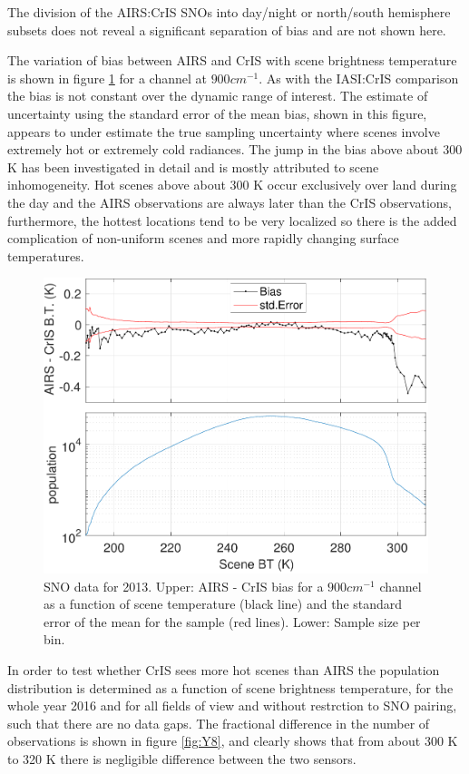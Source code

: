 \documentclass[twocolumn,10pt]{article}
\begin{document}
The division of the AIRS:CrIS SNOs into day/night or north/south hemisphere subsets does not reveal a significant separation of bias and are not shown here.

The variation of bias between AIRS and CrIS with scene brightness temperature is shown in figure \ref{fig:Y7} for a channel at $ 900 cm^{-1} $. As with the IASI:CrIS comparison the bias is not constant over the dynamic range of interest. The estimate of uncertainty using the standard error of the mean bias, shown in this figure, appears to under estimate the true sampling uncertainty where scenes involve extremely hot or extremely cold radiances. The jump in the bias above about 300 K has been investigated in detail and is mostly attributed to scene inhomogeneity. Hot scenes above about 300 K occur exclusively over land during the day and the AIRS observations are always later than the CrIS observations, furthermore, the hottest locations tend to be very localized so there is the added complication of non-uniform scenes and more rapidly changing surface temperatures.

\begin{figure}[htb]
\centering
\includegraphics[width=\linewidth]{./figs/ac_jpl_sno_900wn_bias_vs_scene.pdf}
\caption{
  SNO data for 2013. Upper: AIRS - CrIS bias for a $900 cm^{-1}$ channel as a function of scene temperature (black line) and the standard error of the mean for the sample (red lines). Lower: Sample size per bin.}
\label{fig:Y7}
\end{figure}

In order to test whether CrIS sees more hot scenes than AIRS the population distribution is determined as a function of scene brightness temperature, for the whole year 2016 and for all fields of view and without restrction to SNO pairing, such that there are no data gaps. The fractional difference in the number of observations is shown in figure \ref{fig:Y8}, and clearly shows that from about 300 K to 320 K there is negligible difference between the two sensors.  
\end{document}
